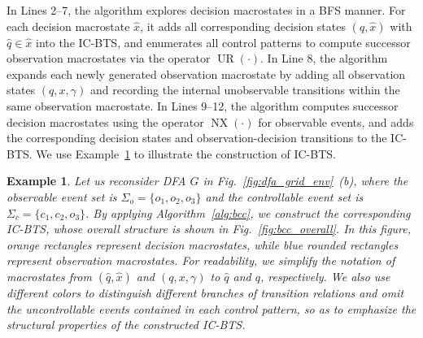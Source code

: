 \documentclass[twocolumn]{autart}
\def \UR{\operatorname{UR}}
\def \NX{\operatorname{NX}}
\newtheorem{myexm}{Example}
\begin{document}
In Lines 2--7, the algorithm explores decision macrostates in a BFS manner.
For each decision macrostate $\hat{x}$, it adds all corresponding decision states $(\hat{q}, \hat{x})$ with $\hat{q} \in \hat{x}$ into the IC-BTS, and enumerates all control patterns to compute successor observation macrostates via the operator $\UR(\cdot)$.
In Line 8, the algorithm expands each newly generated observation macrostate by adding all observation states $(q, x, \gamma)$ and recording the internal unobservable transitions within the same observation macrostate.
In Lines 9--12, the algorithm computes successor decision macrostates using the operator $\NX(\cdot)$ for observable events, and adds the corresponding decision states and observation-decision transitions to the IC-BTS.
We use Example~\ref{ex:bcc} to illustrate the construction of IC-BTS.
\begin{myexm}\label{ex:bcc}
    Let us reconsider DFA $G$ in Fig.~\ref{fig:dfa_grid_env}~(b), where the observable event set is
    $\Sigma_o = \{o_1,o_2,o_3\}$ and the controllable event set is
    $\Sigma_c = \{c_1,c_2,o_3\}$.
    By applying Algorithm~\ref{alg:bcc}, we construct the corresponding IC-BTS, whose overall structure is shown in Fig.~\ref{fig:bcc_overall}.
    In this figure, orange rectangles represent decision macrostates, while blue rounded rectangles represent observation macrostates.
    For readability, we simplify the notation of macrostates from $(\hat{q},\hat{x})$ and $(q,x,\gamma)$ to $\hat{q}$ and $q$, respectively.
    We also use different colors to distinguish different branches of transition relations and omit the uncontrollable events contained in each control pattern, so as to emphasize the structural properties of the constructed IC-BTS.


\end{myexm}
\end{document}
